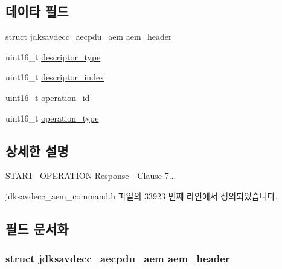 \subsection*{데이타 필드}
\begin{DoxyCompactItemize}
\item 
struct \hyperlink{structjdksavdecc__aecpdu__aem}{jdksavdecc\+\_\+aecpdu\+\_\+aem} \hyperlink{structjdksavdecc__aem__command__start__operation__response_ae1e77ccb75ff5021ad923221eab38294}{aem\+\_\+header}
\item 
uint16\+\_\+t \hyperlink{structjdksavdecc__aem__command__start__operation__response_ab7c32b6c7131c13d4ea3b7ee2f09b78d}{descriptor\+\_\+type}
\item 
uint16\+\_\+t \hyperlink{structjdksavdecc__aem__command__start__operation__response_a042bbc76d835b82d27c1932431ee38d4}{descriptor\+\_\+index}
\item 
uint16\+\_\+t \hyperlink{structjdksavdecc__aem__command__start__operation__response_a5b1b19c38a3b340cfc6ebcb9eeb153e2}{operation\+\_\+id}
\item 
uint16\+\_\+t \hyperlink{structjdksavdecc__aem__command__start__operation__response_ab2dfcd06646c4907feb4ec8153ba7b79}{operation\+\_\+type}
\end{DoxyCompactItemize}


\subsection{상세한 설명}
S\+T\+A\+R\+T\+\_\+\+O\+P\+E\+R\+A\+T\+I\+ON Response -\/ Clause 7... 

jdksavdecc\+\_\+aem\+\_\+command.\+h 파일의 33923 번째 라인에서 정의되었습니다.



\subsection{필드 문서화}
\subsubsection[{\texorpdfstring{aem\+\_\+header}{aem_header}}]{\setlength{\rightskip}{0pt plus 5cm}struct {\bf jdksavdecc\+\_\+aecpdu\+\_\+aem} aem\+\_\+header}\hypertarget{structjdksavdecc__aem__command__start__operation__response_ae1e77ccb75ff5021ad923221eab38294}{}\label{structjdksavdecc__aem__command__start__operation__response_ae1e77ccb75ff5021ad923221eab38294}


